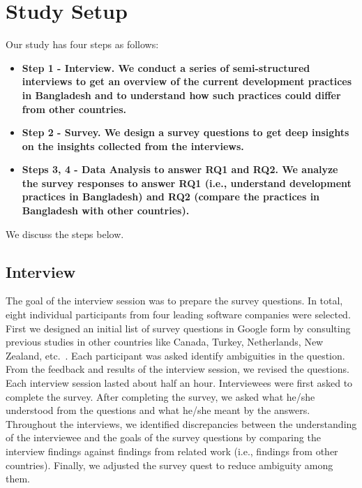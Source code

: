 \section{Study Setup}
\label{study_setup}

Our study has four steps as follows:
\begin{itemize}[leftmargin=10pt]
  \item\bf{Step 1 - Interview.}  We conduct a series of semi-structured interviews to get an overview of the current development practices in Bangladesh and to understand how 
  such practices could differ from other countries.
  \item\bf{Step 2 - Survey.} We design a survey questions to get deep insights on the insights collected from the interviews. 
  \item\bf{Steps 3, 4 - Data Analysis to answer RQ1 and RQ2.} We analyze the survey responses to answer RQ1 (i.e., understand development practices in Bangladesh) and RQ2 (compare the practices in Bangladesh with other countries).
\end{itemize} We discuss the steps below.
\subsection{Interview}
The goal of
the interview session was to prepare the survey questions. In
total, eight individual participants from four leading software companies were
selected. First we designed an initial list of survey questions in Google form by consulting previous studies in other countries like 
Canada, Turkey, Netherlands, New Zealand, etc.~\cite{Garousi2013, Garousi2015, Vonken2012, Wang2018}. Each
participant was asked
identify ambiguities in the question. From the feedback and results of the
interview session, we revised the questions. Each interview session lasted about half an hour. 
Interviewees were first asked to complete the survey.
After completing the survey, we asked what he/she understood from the questions
and what he/she meant by the answers. Throughout the interviews, we identified
discrepancies between the understanding of the interviewee and the goals of the
survey questions by comparing the interview findings against findings from related work (i.e., findings from other countries). 
Finally, we adjusted the survey quest to reduce ambiguity among them.


